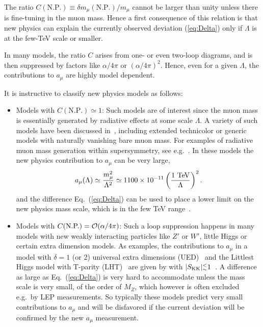 The ratio $C(\mbox{N.P.})\equiv\delta m_\mu(\mbox{N.P.})/{m_\mu}$
cannot be larger than unity unless there is fine-tuning in the muon
mass. Hence a first consequence of this relation is that new physics
can explain the currently observed deviation (\ref{eq:Delta}) only if
$\Lambda$ is at the few-TeV scale or smaller.

In many models, the ratio $C$ arises from one- or even two-loop
diagrams, and is then suppressed by factors like  $\alpha/4\pi$ or
$(\alpha/4\pi)^2$. Hence, even for a given $\Lambda$, the
contributions to $a_\mu$ are highly model dependent.

It is instructive to classify new physics models as follows:
\begin{itemize}
\item Models with $C(\mbox{N.P.})\simeq1$: Such models are of interest
  since the muon
  mass is essentially generated by radiative effects  at some
scale $\Lambda$.
A variety of such models  have been discussed in~\cite{czmar}, including
extended technicolor or generic models with naturally vanishing bare
muon mass. For examples of radiative muon mass generation within
supersymmetry, see e.g.\ 
\cite{Borzumati:1999sp,Crivellin:2010ty}.  In these models the
new physics contribution to $a_\mu$ can be very large, 
\begin{equation} 
a_{\mu}
(\Lambda) \simeq {m^2_{\mu} \over \Lambda^2}\simeq
1100\times10^{-11}\left(\frac{1\mbox{ TeV}}{\Lambda}\right)^2. 
\end{equation}
and the difference Eq.~(\ref{eq:Delta}) can  be used to place a lower
limit on the new physics mass scale, which is in the few TeV
range~\cite{elp,Crivellin:2010ty}.
\item Models with $C(\mbox{N.P.})={\cal O}(\alpha/4\pi)$:
Such a loop suppression happens in many models with new weakly
interacting particles like $Z'$ or $W'$, little Higgs or certain extra
dimension models.  As examples, the contributions to $a_\mu$ in a
model with $\delta=1$ (or
2) universal extra dimensions (UED)~\cite{AppelqDob} and the Littlest Higgs
model with T-parity (LHT)~\cite{Blanke:2007db} are given by
 with $|S_{\rm KK}| _{\sim}^{<}1$~\cite{AppelqDob}.
A difference as large as
Eq.~(\ref{eq:Delta}) is very hard to accommodate unless the mass scale
is very small, of the order of $M_Z$, which however is often excluded
e.g.\ by LEP measurements.
So typically these models predict very small contributions to $a_\mu$
and will be disfavored if the current deviation will be confirmed by
the new $a_\mu$ measurement.


\end{itemize}
